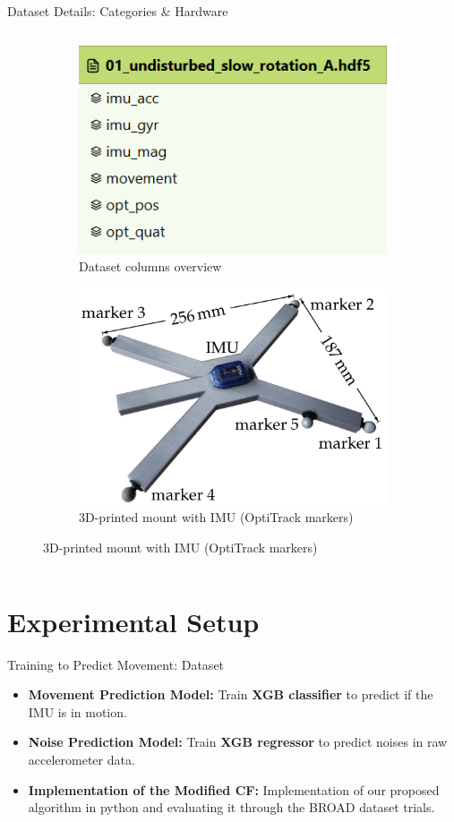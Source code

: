 \documentclass[aspectratio=169,xcolor=dvipsnames]{beamer}
\begin{document}
\begin{frame}{Dataset Details: Categories \& Hardware}
\begin{columns}[T]
  \begin{column}{0.5\textwidth}
    \begin{figure}
      \centering
      \begin{subfigure}[t]{\columnwidth}
        \includegraphics[width=0.5\linewidth]{logos/dataset.png}
        \caption{Dataset columns overview}
        \label{fig:datase}
      \end{subfigure}
      \vspace{0.5em}
      \begin{subfigure}[t]{\columnwidth}
        \includegraphics[width=0.5\linewidth]{logos/imu_hardware_mount.png}
        \caption{3D-printed mount with IMU (OptiTrack markers)}
        \label{fig:IMUhardware}
      \end{subfigure}
    \end{figure}
  \end{column}
\end{columns}
\end{frame}

\section{Experimental Setup}

\begin{frame}{Training to Predict Movement: Dataset}
\begin{itemize}
    \item \textbf{Movement Prediction Model:} Train \textbf{XGB classifier} to predict if the IMU is in motion.
    \item \textbf{Noise Prediction Model:} Train \textbf{XGB regressor} to predict noises in raw accelerometer data.
    \item \textbf{Implementation of the Modified CF:} Implementation of our proposed algorithm in python and evaluating it through the BROAD dataset trials.
\end{itemize}

\end{frame}
\end{document}
